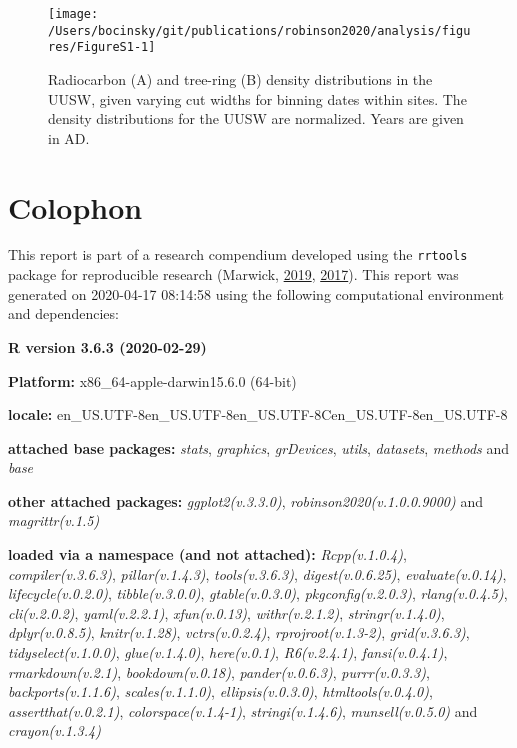 \documentclass[
]{sa}
\begin{document}
\begin{figure}

{\centering \texttt{[image: /Users/bocinsky/git/publications/robinson2020/analysis/figures/FigureS1-1]} 

}

\caption{Radiocarbon (A) and tree-ring (B) density distributions in the UUSW, given varying cut widths for binning dates within sites. The density distributions for the UUSW are normalized. Years are given in AD.}\label{fig:FigureS1}
\end{figure}

\newpage

\hypertarget{colophon}{%
\section*{Colophon}\label{colophon}}

This report is part of a research compendium developed using the \texttt{rrtools} package for reproducible research (Marwick, \protect\hyperlink{ref-rrtools}{2019}, \protect\hyperlink{ref-Marwick2017}{2017}). This report was generated on 2020-04-17 08:14:58 using the following computational environment and dependencies:

\textbf{R version 3.6.3 (2020-02-29)}

\textbf{Platform:} x86\_64-apple-darwin15.6.0 (64-bit)

\textbf{locale:}
en\_US.UTF-8\textbar\textbar en\_US.UTF-8\textbar\textbar en\_US.UTF-8\textbar\textbar C\textbar\textbar en\_US.UTF-8\textbar\textbar en\_US.UTF-8

\textbf{attached base packages:}
\emph{stats}, \emph{graphics}, \emph{grDevices}, \emph{utils}, \emph{datasets}, \emph{methods} and \emph{base}

\textbf{other attached packages:}
\emph{ggplot2(v.3.3.0)}, \emph{robinson2020(v.1.0.0.9000)} and \emph{magrittr(v.1.5)}

\textbf{loaded via a namespace (and not attached):}
\emph{Rcpp(v.1.0.4)}, \emph{compiler(v.3.6.3)}, \emph{pillar(v.1.4.3)}, \emph{tools(v.3.6.3)}, \emph{digest(v.0.6.25)}, \emph{evaluate(v.0.14)}, \emph{lifecycle(v.0.2.0)}, \emph{tibble(v.3.0.0)}, \emph{gtable(v.0.3.0)}, \emph{pkgconfig(v.2.0.3)}, \emph{rlang(v.0.4.5)}, \emph{cli(v.2.0.2)}, \emph{yaml(v.2.2.1)}, \emph{xfun(v.0.13)}, \emph{withr(v.2.1.2)}, \emph{stringr(v.1.4.0)}, \emph{dplyr(v.0.8.5)}, \emph{knitr(v.1.28)}, \emph{vctrs(v.0.2.4)}, \emph{rprojroot(v.1.3-2)}, \emph{grid(v.3.6.3)}, \emph{tidyselect(v.1.0.0)}, \emph{glue(v.1.4.0)}, \emph{here(v.0.1)}, \emph{R6(v.2.4.1)}, \emph{fansi(v.0.4.1)}, \emph{rmarkdown(v.2.1)}, \emph{bookdown(v.0.18)}, \emph{pander(v.0.6.3)}, \emph{purrr(v.0.3.3)}, \emph{backports(v.1.1.6)}, \emph{scales(v.1.1.0)}, \emph{ellipsis(v.0.3.0)}, \emph{htmltools(v.0.4.0)}, \emph{assertthat(v.0.2.1)}, \emph{colorspace(v.1.4-1)}, \emph{stringi(v.1.4.6)}, \emph{munsell(v.0.5.0)} and \emph{crayon(v.1.3.4)}
\end{document}

